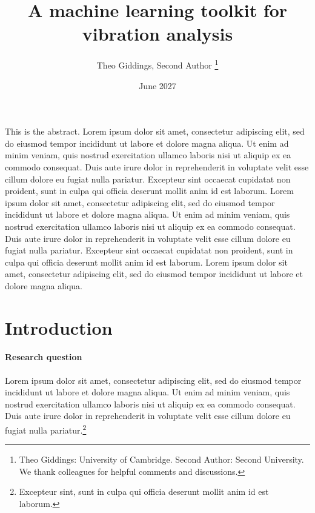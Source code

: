 \documentclass[letterpaper,11pt,leqno]{article}
\begin{document}
\title{A machine learning toolkit for vibration analysis}

\author{Theo Giddings, Second Author
%
\thanks{Theo Giddings: University of Cambridge. Second Author: Second University. We thank colleagues for helpful comments and discussions.}}

\date{June 2027}   


\begin{titlepage}
\maketitle

This is the abstract. Lorem ipsum dolor sit amet, consectetur adipiscing elit, sed do eiusmod tempor incididunt ut labore et dolore magna aliqua. Ut enim ad minim veniam, quis nostrud exercitation ullamco laboris nisi ut aliquip ex ea commodo consequat. Duis aute irure dolor in reprehenderit in voluptate velit esse cillum dolore eu fugiat nulla pariatur. Excepteur sint occaecat cupidatat non proident, sunt in culpa qui officia deserunt mollit anim id est laborum. Lorem ipsum dolor sit amet, consectetur adipiscing elit, sed do eiusmod tempor incididunt ut labore et dolore magna aliqua. Ut enim ad minim veniam, quis nostrud exercitation ullamco laboris nisi ut aliquip ex ea commodo consequat. Duis aute irure dolor in reprehenderit in voluptate velit esse cillum dolore eu fugiat nulla pariatur. Excepteur sint occaecat cupidatat non proident, sunt in culpa qui officia deserunt mollit anim id est laborum. Lorem ipsum dolor sit amet, consectetur adipiscing elit, sed do eiusmod tempor incididunt ut labore et dolore magna aliqua.

\end{titlepage}

\section{Introduction}\label{s:introduction}
 
\paragraph{Research question} Lorem ipsum dolor sit amet, consectetur adipiscing elit, sed do eiusmod tempor incididunt ut labore et dolore magna aliqua. Ut enim ad minim veniam, quis nostrud exercitation ullamco laboris nisi ut aliquip ex ea commodo consequat. Duis aute irure dolor in reprehenderit in voluptate velit esse cillum dolore eu fugiat nulla pariatur.\footnote{Excepteur sint, sunt in culpa qui officia deserunt mollit anim id est laborum.}
\end{document}
